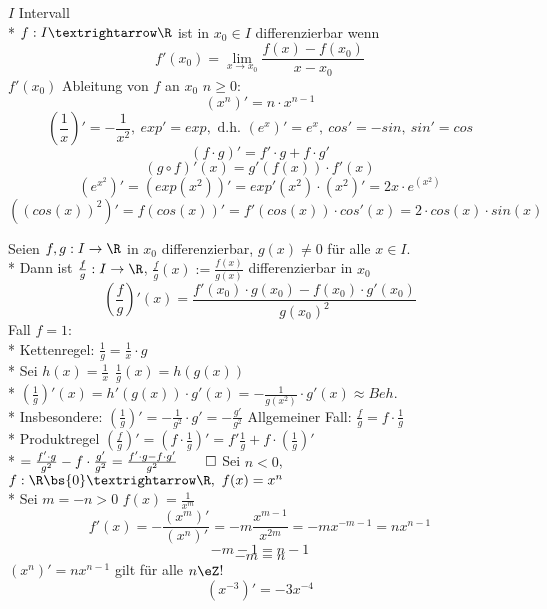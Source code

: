 %
\wdh
$I$ Intervall\\*
$f:I→\R$ ist in $x_0\in I$ differenzierbar wenn $$f'(x_0)=\lim_{x→x_0}\frac{f(x)-f(x_0)}{x-x_0}$$
$f'(x_0)$ Ableitung von $f$ an $x_0$
\bsp
$n\geq 0:$ $$(x^n)'=n·x^{n-1}$$
$$(\frac{1}{x})'=-\frac{1}{x^2},\ exp'=exp,\text{ d.h. }(e^x)'=e^x,\ cos'=-sin,\ sin'=cos$$
$$(f·g)'=f'·g+f·g'$$
$$(g\circ f)'(x)=g'(f(x))·f'(x)$$
\bsp
$$(e^{x^2})'=(exp(x^2))'=exp'(x^2)·(x^2)'=2x·e^(x^2)$$
$$((cos (x))^2)' = f(cos (x))' = f'(cos (x)) \cdot cos'(x) = 2 \cdot cos(x) \cdot sin(x)$$

Seien $f, g: I \to \R$ in $x_0$ differenzierbar, $g(x) \neq 0$ für alle $x \in I$.\\*
Dann ist $\frac{f}{g}: I \to \R$, $\frac{f}{g}(x) := \frac{f(x)}{g(x)}$ differenzierbar in $x_0$
$$\left(\frac{f}{g}\right)'(x) = \frac{f'(x_0)\cdot g(x_0) - f(x_0) \cdot g'(x_0)}{g(x_0)^2}$$
\bew
Fall $f = 1$:\\*
Kettenregel:
$\frac{1}{g} = \frac{1}{x} \cdot g$\\*
Sei $h(x) = \frac{1}{x}\ \ \frac{1}{g}(x) = h(g(x))$ \\*
$(\frac{1}{g})'(x) = h'(g(x)) \cdot g'(x) = - \frac{1}{g(x^2)} \cdot g'(x) \approx Beh.$\\*
Insbesondere: $(\frac{1}{g})' = -\frac{1}{g^2} \cdot g' = -\frac{g'}{g^2}$
Allgemeiner Fall:
$\frac{f}{g} = f \cdot \frac{1}{g}$\\*
Produktregel \Rarr{} $(\frac{f}{g})' = (f \cdot \frac{1}{g})' = f'\frac{1}{g} + f \cdot (\frac{1}{g})'$\\*
$= \frac{f' \cdot g}{g^2} - f\cdot \frac{g'}{g^2} = \frac{f'\cdot g - f \cdot g'}{g^2} \qed$
\bsp
Sei $n<0$, $f:\R\bs\{0\}→\R,\ f(x)=x^n$\\*
Sei $m=-n>0$ $f(x)=\frac{1}{x^m}$
$$f'(x)=-\frac{(x^m)'}{(x^n)'}=-m\frac{x^{m-1}}{x^{2m}}=-mx^{-m-1}=nx^{n-1}$$
$$-m-1=n-1$$ $$-m=n$$
$(x^n)'=nx^{n-1}$ gilt für alle $n\eZ$!
$$(x^{-3})'=-3x^{-4}$$

